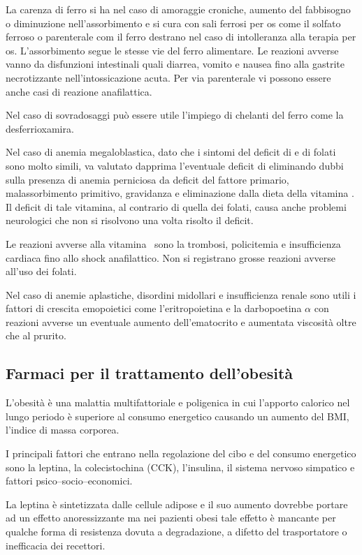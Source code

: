 La carenza di ferro si ha nel caso di amoraggie croniche, aumento del fabbisogno o diminuzione nell'assorbimento e si cura con sali ferrosi per os come il solfato ferroso o parenterale com il ferro destrano nel caso di intolleranza alla terapia per os. L'assorbimento segue le stesse vie del ferro alimentare. Le reazioni avverse vanno da disfunzioni intestinali quali diarrea, vomito e nausea fino alla gastrite necrotizzante nell'intossicazione acuta. Per via parenterale vi possono essere anche casi di reazione anafilattica.

Nel caso di sovradosaggi può essere utile l'impiego di chelanti del ferro come la desferrioxamira.

Nel caso di anemia megaloblastica, dato che i sintomi del deficit di  e di folati sono molto simili, va valutato dapprima l'eventuale deficit di  eliminando dubbi sulla presenza di anemia perniciosa da deficit del fattore primario, malassorbimento primitivo, gravidanza e eliminazione dalla dieta della vitamina . Il deficit di tale vitamina, al contrario di quella dei folati, causa anche problemi neurologici che non si risolvono una volta risolto il deficit.

Le reazioni avverse alla vitamina~ sono la trombosi, policitemia e insufficienza cardiaca fino allo shock anafilattico. Non si registrano grosse reazioni avverse all'uso dei folati.

Nel caso di anemie aplastiche, disordini midollari e insufficienza renale sono utili i fattori di crescita emopoietici come l'eritropoietina e la darbopoetina $\alpha$ con reazioni avverse un eventuale aumento dell'ematocrito e aumentata viscosità oltre che al prurito.

\subsection{Farmaci per il trattamento dell'obesità}

L'obesità è una malattia multifattoriale e poligenica in cui l'apporto calorico nel lungo periodo è superiore al consumo energetico causando un aumento del BMI, l'indice di massa corporea.

I principali fattori che entrano nella regolazione del cibo e del consumo energetico sono la leptina, la colecistochina (CCK), l'insulina, il sistema nervoso simpatico e fattori psico--socio--economici.

La leptina è sintetizzata dalle cellule adipose e il suo aumento dovrebbe portare ad un effetto anoressizzante ma nei pazienti obesi tale effetto è mancante per qualche forma di resistenza dovuta a degradazione, a difetto del trasportatore o inefficacia dei recettori.

